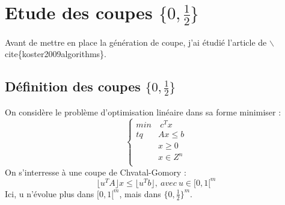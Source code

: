 \documentclass[12pt]{report}
\begin{document}
\section{Etude des coupes $\{0,\frac{1}{2}\}$ }
Avant de mettre en place la génération de coupe, j'ai étudié l'article de $\backslash$cite\{koster2009algorithms\}.

\subsection{Définition des coupes $\{0,\frac{1}{2}\}$}
On considère le problème d'optimisation linéaire dans sa forme minimiser :
$$
\left\{
    \begin{array}{ll}
        min& \ c^Tx \\
        tq &  Ax \le b \\
          & x \ge 0 \\
          & x \in Z^n \\
    \end{array}
\right.
$$
On s'interresse à une coupe de Chvatal-Gomory :
$$
\lfloor u^TA \rfloor x \le \lfloor u^Tb \rfloor, \ avec \ u \in [0,1[^m
$$
Ici, u n'évolue plus dans $[0,1[^m$, mais dans $\{0,\frac{1}{2}\}^m$.
\end{document}
